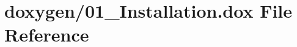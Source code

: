 \hypertarget{01__Installation_8dox}{\section{doxygen/01\+\_\+\+Installation.dox File Reference}
\label{01__Installation_8dox}
}

